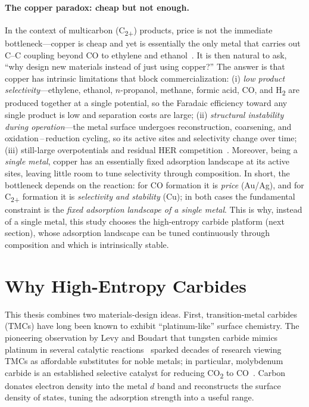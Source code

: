 \documentclass[11pt,a4paper]{report}
\begin{document}
\paragraph{The copper paradox: cheap but not enough.} In the context of multicarbon (C\textsubscript{2+}) products, price is not the immediate bottleneck---copper is cheap and yet is essentially the only metal that carries out C--C coupling beyond CO to ethylene and ethanol~\cite{nitopi2019}. It is then natural to ask, ``why design new materials instead of just using copper?'' The answer is that copper has intrinsic limitations that block commercialization: (i) \emph{low product selectivity}---ethylene, ethanol, $n$-propanol, methane, formic acid, CO, and H\textsubscript{2} are produced together at a single potential, so the Faradaic efficiency toward any single product is low and separation costs are large; (ii) \emph{structural instability during operation}---the metal surface undergoes reconstruction, coarsening, and oxidation\,--\,reduction cycling, so its active sites and selectivity change over time; (iii) still-large overpotentials and residual HER competition~\cite{nitopi2019}. Moreover, being a \emph{single metal}, copper has an essentially fixed adsorption landscape at its active sites, leaving little room to tune selectivity through composition. In short, the bottleneck depends on the reaction: for CO formation it is \emph{price} (Au/Ag), and for C\textsubscript{2+} formation it is \emph{selectivity and stability} (Cu); in both cases the fundamental constraint is the \emph{fixed adsorption landscape of a single metal}. This is why, instead of a single metal, this study chooses the high-entropy carbide platform (next section), whose adsorption landscape can be tuned continuously through composition and which is intrinsically stable.

\section{Why High-Entropy Carbides}
This thesis combines two materials-design ideas. First, transition-metal carbides (TMCs) have long been known to exhibit ``platinum-like'' surface chemistry. The pioneering observation by Levy and Boudart that tungsten carbide mimics platinum in several catalytic reactions~\cite{levy1973} sparked decades of research viewing TMCs as affordable substitutes for noble metals; in particular, molybdenum carbide is an established selective catalyst for reducing CO\textsubscript{2} to CO~\cite{porosoff2014}. Carbon donates electron density into the metal $d$ band and reconstructs the surface density of states, tuning the adsorption strength into a useful range.
\end{document}
